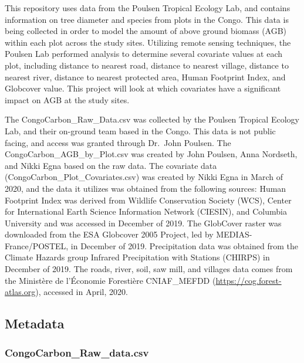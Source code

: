 \documentclass[12pt,]{article}
\begin{document}
This repository uses data from the Poulsen Tropical Ecology Lab, and
contains information on tree diameter and species from plots in the
Congo. This data is being collected in order to model the amount of
above ground biomass (AGB) within each plot across the study sites.
Utilizing remote sensing techniques, the Poulsen Lab performed analysis
to determine several covariate values at each plot, including distance
to nearest road, distance to nearest village, distance to nearest river,
distance to nearest protected area, Human Footprint Index, and Globcover
value. This project will look at which covariates have a significant
impact on AGB at the study sites.

The CongoCarbon\_Raw\_Data.csv was collected by the Poulsen Tropical
Ecology Lab, and their on-ground team based in the Congo. This data is
not public facing, and access was granted through Dr.~John Poulsen. The
CongoCarbon\_AGB\_by\_Plot.csv was created by John Poulsen, Anna
Nordseth, and Nikki Egna based on the raw data. The covariate data
(CongoCarbon\_Plot\_Covariates.csv) was created by Nikki Egna in March
of 2020, and the data it utilizes was obtained from the following
sources: Human Footprint Index was derived from Wildlife Conservation
Society (WCS), Center for International Earth Science Information
Network (CIESIN), and Columbia University and was accessed in December
of 2019. The GlobCover raster was downloaded from the ESA Globcover 2005
Project, led by MEDIAS-France/POSTEL, in December of 2019. Precipitation
data was obtained from the Climate Hazards group Infrared Precipitation
with Stations (CHIRPS) in December of 2019. The roads, river, soil, saw
mill, and villages data comes from the Ministère de l'Économie
Forestière CNIAF\_MEFDD (\url{https://cog.forest-atlas.org}), accessed
in April, 2020.

\hypertarget{metadata}{%
\subsection{Metadata}\label{metadata}}

\hypertarget{congocarbon_raw_data.csv}{%
\subsubsection{CongoCarbon\_Raw\_data.csv}\label{congocarbon_raw_data.csv}}
\end{document}
